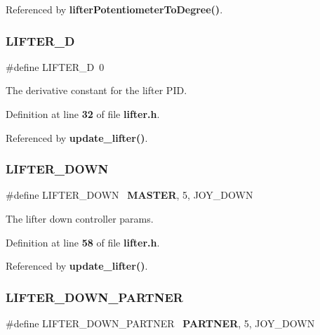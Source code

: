 Referenced by \textbf{ lifter\+Potentiometer\+To\+Degree()}.

\mbox{\label{lifter_8h_ad03f59237a197767913457abd53f1780}} 
\subsubsection{L\+I\+F\+T\+E\+R\+\_\+D}
{\footnotesize\ttfamily \#define L\+I\+F\+T\+E\+R\+\_\+D~0}



The derivative constant for the lifter P\+ID. 



Definition at line \textbf{ 32} of file \textbf{ lifter.\+h}.



Referenced by \textbf{ update\+\_\+lifter()}.

\mbox{\label{lifter_8h_a12f8c1de242a92f5694e6b80b990773a}} 
\subsubsection{L\+I\+F\+T\+E\+R\+\_\+\+D\+O\+WN}
{\footnotesize\ttfamily \#define L\+I\+F\+T\+E\+R\+\_\+\+D\+O\+WN~\textbf{ M\+A\+S\+T\+ER}, 5, J\+O\+Y\+\_\+\+D\+O\+WN}



The lifter down controller params. 



Definition at line \textbf{ 58} of file \textbf{ lifter.\+h}.



Referenced by \textbf{ update\+\_\+lifter()}.

\mbox{\label{lifter_8h_a40a0b4dc0172c4133a34d5e3d8b69f9a}} 
\subsubsection{L\+I\+F\+T\+E\+R\+\_\+\+D\+O\+W\+N\+\_\+\+P\+A\+R\+T\+N\+ER}
{\footnotesize\ttfamily \#define L\+I\+F\+T\+E\+R\+\_\+\+D\+O\+W\+N\+\_\+\+P\+A\+R\+T\+N\+ER~\textbf{ P\+A\+R\+T\+N\+ER}, 5, J\+O\+Y\+\_\+\+D\+O\+WN}



